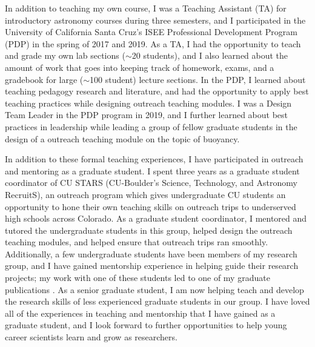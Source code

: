 \documentclass[aps, pre, onecolumn, nofootinbib, notitlepage, groupedaddress, amsfonts, amssymb, amsmath]{revtex4-1}
\begin{document}
In addition to teaching my own course, I was a Teaching Assistant (TA) for introductory astronomy courses during three semesters, and I participated in the University of California Santa Cruz's ISEE Professional Development Program (PDP) in the spring of 2017 and 2019.
As a TA, I had the opportunity to teach and grade my own lab sections ($\sim$20 students), and I also learned about the amount of work that goes into keeping track of homework, exams, and a gradebook for large ($\sim$100 student) lecture sections.
In the PDP, I learned about teaching pedagogy research and literature, and had the opportunity to apply best teaching practices while designing outreach teaching modules.
I was a Design Team Leader in the PDP program in 2019, and I further learned about best practices in leadership while leading a group of fellow graduate students in the design of a outreach teaching module on the topic of buoyancy.

In addition to these formal teaching experiences, I have participated in outreach and mentoring as a graduate student.
I spent three years as a graduate student coordinator of CU STARS (CU-Boulder's Science, Technology, and Astronomy RecruitS), an outreach program which gives undergraduate CU students an opportunity to hone their own teaching skills on outreach trips to underserved high schools across Colorado.
As a graduate student coordinator, I mentored and tutored the undergraduate students in this group, helped design the outreach teaching modules, and helped ensure that outreach trips ran smoothly.
Additionally, a few undergraduate students have been members of my research group, and I have gained mentorship experience in helping guide their research projects; my work with one of these students led to one of my graduate publications \citep{anders&all2019}.
As a senior graduate student, I am now helping teach and develop the research skills of less experienced graduate students in our group.
I have loved all of the experiences in teaching and mentorship that I have gained as a graduate student, and I look forward to further opportunities to help young career scientists learn and grow as researchers.
\end{document}
